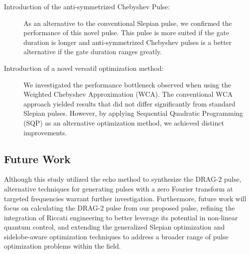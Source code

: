 \begin{description}
  \item[Introduction of the anti-symmetrized Chebyshev Pulse: ] As an alternative to the conventional Slepian pulse, we confirmed the performance of this
        novel pulse. This pulse is more suited if the  gate duration is longer and
        anti-symmetrized Chebyshev pulses is a better alternative if the gate duration ranges greatly.

  \item[Introduction of a novel versatil optimization method: ]We investigated the performance bottleneck observed when
        using the Weighted Chebyshev Approximation (WCA). The conventional WCA approach yielded results that did not differ
        significantly from standard Slepian pulses. However, by applying Sequential Quadratic Programming (SQP) as an
        alternative optimization method, we achieved distinct improvements.
\end{description}

\subsection{Future Work}
Although this study utilized the echo method to synthesize the DRAG-2 pulse, alternative techniques for generating
pulses with a zero Fourier transform at targeted frequencies warrant further investigation.
Furthermore, future work will focus on calculating the DRAG-2 pulse from our proposed pulse, refining the integration of Riccati engineering to better leverage its potential
in non-linear quantum control, and extending the generalized Slepian optimization and sidelobe-aware optimization techniques to address a broader range of pulse
optimization problems within the field.
